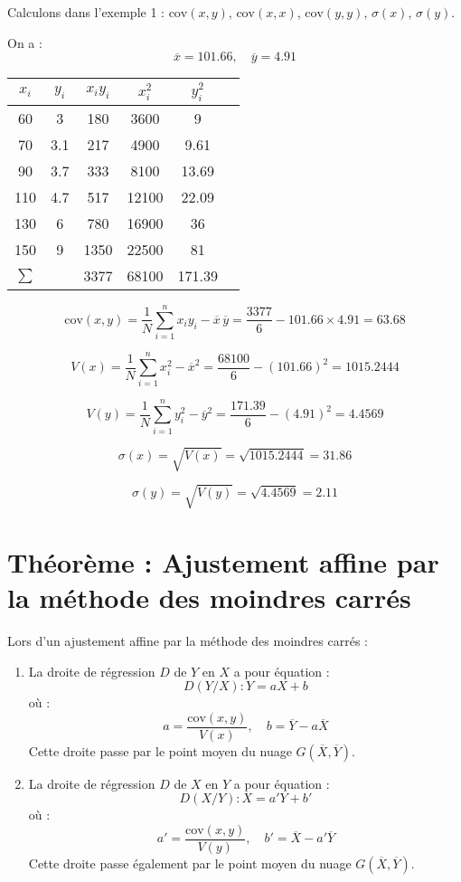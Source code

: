\documentclass[11pt]{article}
\begin{document}
\begin{exemple}
Calculons dans l'exemple 1 : $\text{cov}(x, y)$, $\text{cov}(x, x)$, $\text{cov}(y, y)$, $\sigma(x)$, $\sigma(y)$.

On a :
\[
\overline{x} = 101.66, \quad \overline{y} = 4.91
\]

\begin{center}
\begin{tabular}{|c|c|c|c|c|c|}
\hline
$x_i$ & $y_i$ & $x_i y_i$ & $x_i^2$ & $y_i^2$ \\
\hline
60 & 3 & 180 & 3600 & 9 \\
70 & 3.1 & 217 & 4900 & 9.61 \\
90 & 3.7 & 333 & 8100 & 13.69 \\
110 & 4.7 & 517 & 12100 & 22.09 \\
130 & 6 & 780 & 16900 & 36 \\
150 & 9 & 1350 & 22500 & 81 \\
\hline
$\sum$ & & 3377 & 68100 & 171.39 \\
\hline
\end{tabular}
\end{center}

\[
\text{cov}(x, y) = \frac{1}{N} \sum_{i=1}^{n} x_i y_i - \overline{x} \, \overline{y} = \frac{3377}{6} - 101.66 \times 4.91 = 63.68
\]

\[
V(x) = \frac{1}{N} \sum_{i=1}^{n} x_i^2 - \overline{x}^2 = \frac{68100}{6} - (101.66)^2 = 1015.2444
\]

\[
V(y) = \frac{1}{N} \sum_{i=1}^{n} y_i^2 - \overline{y}^2 = \frac{171.39}{6} - (4.91)^2 = 4.4569
\]

\[
\sigma(x) = \sqrt{V(x)} = \sqrt{1015.2444} = 31.86
\]

\[
\sigma(y) = \sqrt{V(y)} = \sqrt{4.4569} = 2.11
\]
\end{exemple}

\section{Théorème : Ajustement affine par la méthode des moindres carrés}

\begin{theoreme}
Lors d’un ajustement affine par la méthode des moindres carrés :
\begin{enumerate}
    \item La droite de régression \( D \) de \( Y \) en \( X \) a pour équation :
    \[
    D(Y/X) : Y = aX + b
    \]
    où :
    \[
    a = \frac{\text{cov}(x, y)}{V(x)}, \quad b = \overline{Y} - a\overline{X}
    \]
    Cette droite passe par le point moyen du nuage \( G(\overline{X}, \overline{Y}) \).

    \item La droite de régression \( D \) de \( X \) en \( Y \) a pour équation :
    \[
    D(X/Y) : X = a'Y + b'
    \]
    où :
    \[
    a' = \frac{\text{cov}(x, y)}{V(y)}, \quad b' = \overline{X} - a'\overline{Y}
    \]
    Cette droite passe également par le point moyen du nuage \( G(\overline{X}, \overline{Y}) \).
\end{enumerate}
\end{theoreme}
\end{document}
